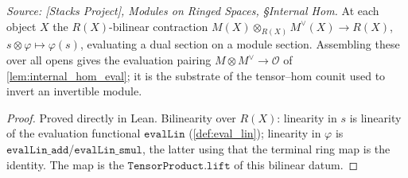 \begin{definition}

  \label{def:internal_hom_eval}
  \textit{Source: [Stacks Project], Modules on Ringed Spaces, \S Internal Hom.}
  At each object \(X\) the \(R(X)\)-bilinear contraction \(M(X) \otimes_{R(X)}
  M^\vee(X) \to R(X)\), \(s \otimes \varphi \mapsto \varphi(s)\), evaluating a dual
  section on a module section. Assembling these over all opens gives the evaluation
  pairing \(M \otimes M^\vee \to \mathcal{O}\) of \cref{lem:internal_hom_eval}; it is the
  substrate of the tensor--hom counit used to invert an invertible module.
\end{definition}
\begin{proof}
  \leanok
  Proved directly in Lean. Bilinearity over \(R(X)\): linearity in \(s\) is linearity of
  the evaluation functional \(\mathtt{evalLin}\) (\cref{def:eval_lin}); linearity in
  \(\varphi\) is \(\mathtt{evalLin\_add}\)/\(\mathtt{evalLin\_smul}\), the latter using
  that the terminal ring map is the identity. The map is the
  \(\mathtt{TensorProduct.lift}\) of this bilinear datum.
\end{proof}

